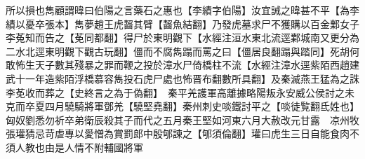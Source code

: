 所以損也雋顧謂暐曰伯陽之言藥石之惠也【李績字伯陽】汝宜誡之暐甚不平【為李績以憂卒張本】雋夢趙王虎齧其臂【齧魚結翻】乃發虎墓求尸不獲購以百金鄴女子李菟知而告之【莬同都翻】得尸於東明觀下【水經注洹水東北流逕鄴城南又更分為二水北逕東明觀下觀古玩翻】僵而不腐雋蹋而罵之曰【僵居良翻蹋與踏同】死胡何敢怖生天子數其殘暴之罪而鞭之投於漳水尸倚橋柱不流【水經注漳水逕紫陌西趙建武十一年造紫陌浮橋慕容雋投石虎尸處也怖晋布翻數所具翻】及秦滅燕王猛為之誅李莬收而葬之【史終言之為于偽翻】　秦平羌護軍高離據略陽叛永安威公侯討之未克而卒夏四月驍騎將軍鄧羌【驍堅堯翻】秦州刺史啖鐵討平之【啖徒覧翻氐姓也】　匈奴劉悉勿祈卒弟衛辰殺其子而代之五月秦王堅如河東六月大赦改元甘露　凉州牧張瓘猜忌苛虐專以愛憎為賞罰郎中殷郇諫之【郇須倫翻】瓘曰虎生三日自能食肉不須人教也由是人情不附輔國將軍